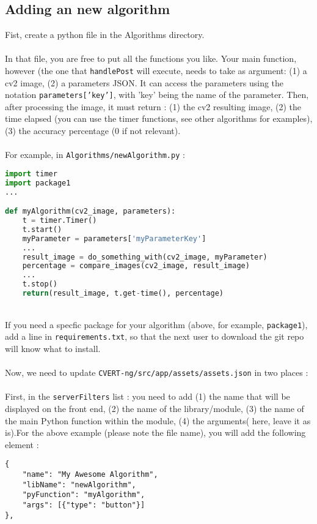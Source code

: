 \documentclass[12pt,a4paper]{article}
\begin{document}
\subsection{Adding an new algorithm}
Fist, create a python file in the Algorithms directory.\\
~\\
In that file, you are free to put all the functions you like. Your main function, however (the one that \texttt{handlePost} will execute, needs to take as argument: (1) a cv2 image, (2) a parameters JSON. It can access the parameters using the notation \texttt{parameters['key']}, with 'key' being the name of the parameter. Then, after processing the image, it must return : (1) the cv2 resulting image, (2) the time elapsed (you can use the timer functions, see other algorithms for examples), (3) the accuracy percentage (0 if not relevant).\\
~\\
For example, in \texttt{Algorithms/newAlgorithm.py} :
\begin{lstlisting}[language=Python]
import timer
import package1
...

def myAlgorithm(cv2_image, parameters):
	t = timer.Timer()
	t.start()
	myParameter = parameters['myParameterKey']
	...
	result_image = do_something_with(cv2_image, myParameter)
	percentage = compare_images(cv2_image, result_image)
	...
	t.stop()
	return(result_image, t.get-time(), percentage)
\end{lstlisting}
~\\
If you need a specfic package for your algorithm (above, for example, \texttt{package1}), add a line in \texttt{requirements.txt}, so that the next user to download the git repo will know what to install.\\
~\\
Now, we need to update \texttt{CVERT-ng/src/app/assets/assets.json} in two places :\\
~\\
First, in the \texttt{serverFilters} list : you need to add (1) the name that will be displayed on the front end, (2) the name of the library/module, (3) the name of the main Python function within the module, (4) the arguments( here, leave it as is).For the above example (please note the file name), you will add the following element :\\

\begin{lstlisting}
{
    "name": "My Awesome Algorithm",
    "libName": "newAlgorithm",
    "pyFunction": "myAlgorithm",
    "args": [{"type": "button"}]
},
\end{lstlisting}
\end{document}

